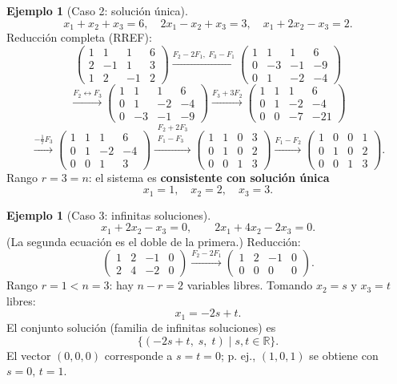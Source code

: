 \documentclass[11pt,letterpaper]{article}
\theoremstyle{definition}
\newtheorem{ejemplo}[definicion]{Ejemplo}
\theoremstyle{plain}
\begin{document}
\begin{ejemplo}[Caso 2: solución única]
\[
  x_1 + x_2 + x_3 = 6,\quad 2x_1 - x_2 + x_3 = 3,\quad x_1 + 2x_2 - x_3 = 2.
\]
Reducción completa (RREF):
\[
  \left(\begin{array}{ccc|c}1&1&1&6\\2&-1&1&3\\1&2&-1&2\end{array}\right)
  \xrightarrow{F_2-2F_1,\;F_3-F_1}
  \left(\begin{array}{ccc|c}1&1&1&6\\0&-3&-1&-9\\0&1&-2&-4\end{array}\right)
\]
\[
  \xrightarrow{F_2\leftrightarrow F_3}
  \left(\begin{array}{ccc|c}1&1&1&6\\0&1&-2&-4\\0&-3&-1&-9\end{array}\right)
  \xrightarrow{F_3+3F_2}
  \left(\begin{array}{ccc|c}1&1&1&6\\0&1&-2&-4\\0&0&-7&-21\end{array}\right)
\]
\[
  \xrightarrow{-\tfrac{1}{7}F_3}
  \left(\begin{array}{ccc|c}1&1&1&6\\0&1&-2&-4\\0&0&1&3\end{array}\right)
  \xrightarrow{\substack{F_2+2F_3\\F_1-F_3}}
  \left(\begin{array}{ccc|c}1&1&0&3\\0&1&0&2\\0&0&1&3\end{array}\right)
  \xrightarrow{F_1-F_2}
  \left(\begin{array}{ccc|c}1&0&0&1\\0&1&0&2\\0&0&1&3\end{array}\right).
\]
Rango $r=3=n$: el sistema es \textbf{consistente con solución única}
\[
  \boxed{x_1=1,\quad x_2=2,\quad x_3=3.}
\]
\end{ejemplo}

\begin{ejemplo}[Caso 3: infinitas soluciones]
\[
  x_1 + 2x_2 - x_3 = 0, \qquad 2x_1 + 4x_2 - 2x_3 = 0.
\]
(La segunda ecuación es el doble de la primera.) Reducción:
\[
  \left(\begin{array}{ccc|c}1&2&-1&0\\2&4&-2&0\end{array}\right)
  \xrightarrow{F_2-2F_1}
  \left(\begin{array}{ccc|c}1&2&-1&0\\0&0&0&0\end{array}\right).
\]
Rango $r=1 < n=3$: hay $n-r=2$ variables libres. Tomando $x_2=s$ y $x_3=t$ libres:
\[
  x_1 = -2s + t.
\]
El conjunto solución (familia de infinitas soluciones) es
\[
  \boxed{\{(-2s+t,\;s,\;t)\mid s,t\in\mathbb{R}\}.}
\]
El vector $(0,0,0)$ corresponde a $s=t=0$; p. ej., $(1,0,1)$ se obtiene con $s=0,\,t=1$.
\end{ejemplo}
\end{document}

